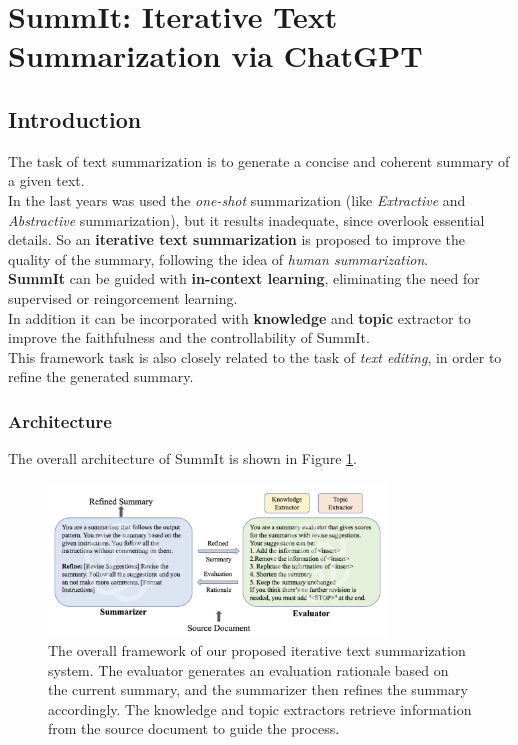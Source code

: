 \documentclass[12pt]{article}
\begin{document}
\section{SummIt: Iterative Text Summarization via ChatGPT}
\label{sec:SummIt}

\subsection{Introduction}   
The task of text summarization is to generate a concise and coherent summary of a given text. \\
In the last years was used the \emph{one-shot} summarization (like \emph{Extractive} and \emph{Abstractive} summarization), but it results inadequate, since overlook essential details. So an \textbf{iterative text summarization} is proposed to improve the quality of the summary, following the idea of \emph{human summarization}. \\
\textbf{SummIt} can be guided with \textbf{in-context learning}, eliminating the need for supervised or reingorcement learning. \\
In addition it can be incorporated with \textbf{knowledge} and \textbf{topic} extractor to improve the faithfulness and the controllability of SummIt. \\
This framework task is also closely related to the task of \emph{text editing}, in order to refine the generated summary.

\subsubsection{Architecture}
\label{subsubsec:SummIt_architecture}

The overall architecture of SummIt is shown in Figure \ref{fig:SummIt_architecture}.

\begin{figure}[h]
    \centering
    \includegraphics[width=0.8\textwidth]{./img/summit_architecture.png}
    \caption{The overall framework of our proposed iterative text summarization system. The evaluator generates an evaluation rationale based on the current summary, and the summarizer then refines the summary accordingly. The knowledge and topic extractors retrieve information from the source document to guide the process.}
    \label{fig:SummIt_architecture}
\end{figure}
\end{document}
